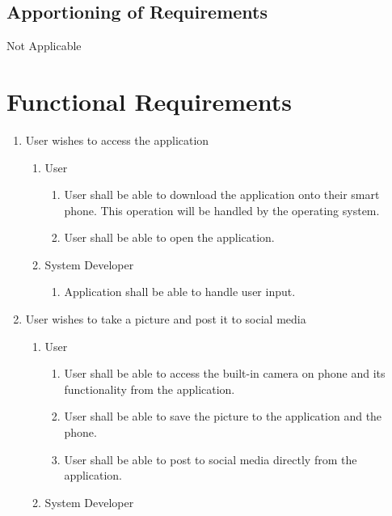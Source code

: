 \documentclass[]{article}
\begin{document}
\subsection{Apportioning of Requirements}
\label{sub:apportioning_of_requirements}
Not Applicable

\section{Functional Requirements}
\label{sec:functional_requirements}


\begin{enumerate}[{BE}1.]
	\item User wishes to access the application
	\begin{enumerate}[{VP1}.1]
		\item User
			\begin{enumerate}
				\item User shall be able to download the application onto their smart phone.  This operation will be handled by the operating system.
				\item User shall be able to open the application.
			\end{enumerate}
		\item System Developer
			\begin{enumerate}
				\item Application shall be able to handle user input.
			\end{enumerate}
	\end{enumerate}
	\item User wishes to take a picture and post it to social media
	\begin{enumerate}[{VP2}.1]
		\item User
			\begin{enumerate}
				\item User shall be able to access the built-in camera on phone and its functionality from the application.
				\item User shall be able to save the picture to the application and the phone.
				\item User shall be able to post to social media directly from the application.
			\end{enumerate}
		\item System Developer
			\begin{enumerate}

\end{enumerate}
\end{enumerate}
\end{enumerate}
\end{document}
